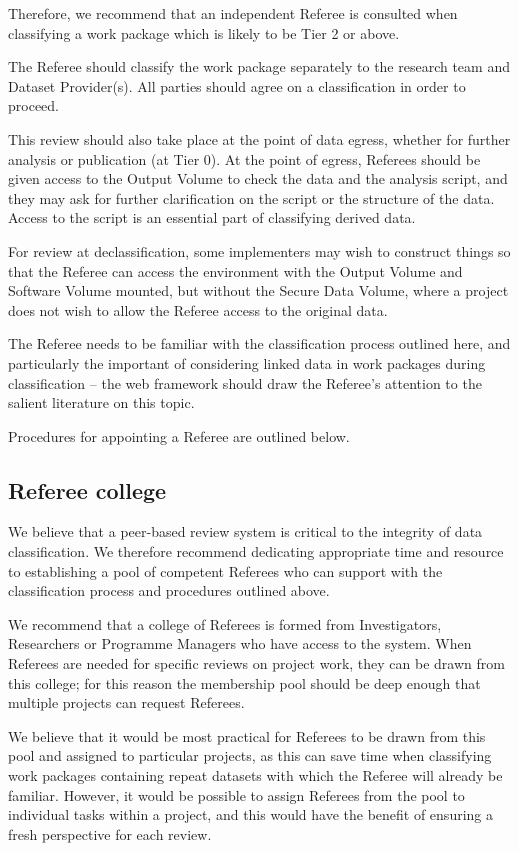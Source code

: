\documentclass[10pt,a4paper,twocolumn]{article}
\begin{document}
Therefore, we recommend that an independent Referee is consulted when classifying a work package which is likely to be Tier 2 or above.  

The Referee should classify the work package separately to the research team and Dataset Provider(s). All parties should agree on a classification in order to proceed.

This review should also take place at the point of data egress, whether for further analysis or publication (at Tier 0). At the point of egress, Referees should be given access to the Output Volume to check the data and the analysis script, and they may ask for further clarification on the script or the structure of the data. Access to the script is an essential part of classifying derived data.

For review at declassification, some implementers may wish to construct things so that the Referee can access the environment with the Output Volume and Software Volume mounted, but without the Secure Data Volume, where a project does not wish to allow the Referee access to the original data. 

The Referee needs to be familiar with the classification process outlined here, and particularly the important of considering linked data in work packages during classification – the web framework should draw the Referee’s attention to the salient literature on this topic. 

Procedures for appointing a Referee are outlined below.

\subsection{Referee college}

We believe that a peer-based review system is critical to the integrity of data classification. We therefore recommend dedicating appropriate time and resource to establishing a pool of competent Referees who can support with the classification process and procedures outlined above.

We recommend that a college of Referees is formed from Investigators, Researchers or Programme Managers who have access to the system. When Referees are needed for specific reviews on project work, they can be drawn from this college; for this reason the membership pool should be deep enough that multiple projects can request Referees. 

We believe that it would be most practical for Referees to be drawn from this pool and assigned to particular projects, as this can save time when classifying work packages containing repeat datasets with which the Referee will already be familiar. However, it would be possible to assign Referees from the pool to individual tasks within a project, and this would have the benefit of ensuring a fresh perspective for each review.
\end{document}
